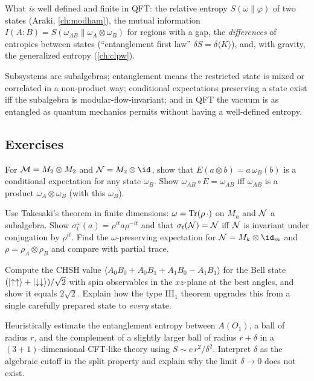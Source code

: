What \emph{is} well defined and finite in QFT: the relative entropy $S(\omega\|\varphi)$ of two states (Araki, \cref{ch:modham}), the mutual information $I(A:B)=S(\omega_{AB}\|\omega_A\otimes\omega_B)$ for regions with a gap, the \emph{differences} of entropies between states (``entanglement first law'' $\delta S=\delta\langle K\rangle$), and, with gravity, the generalized entropy (\cref{ch:clpw}).

\begin{keyidea}
Subsystems are subalgebras; entanglement means the restricted state is mixed or correlated in a non-product way; conditional expectations preserving a state exist iff the subalgebra is modular-flow-invariant; and in QFT the vacuum is as entangled as quantum mechanics permits without having a well-defined entropy.
\end{keyidea}

\subsection*{Exercises}
\begin{exercise}\label{ex:subsystems:1}
For $\mathcal{M}=M_2\otimes M_2$ and $\N=M_2\otimes\id$, show that $E(a\otimes b)=a\,\omega_B(b)$ is a conditional expectation for any state $\omega_B$. Show $\omega_{AB}\circ E=\omega_{AB}$ iff $\omega_{AB}$ is a product $\omega_A\otimes\omega_B$ (with this $\omega_B$).
\end{exercise}
\begin{exercise}\label{ex:subsystems:2}
Use Takesaki's theorem in finite dimensions: $\omega=\operatorname{Tr}(\rho\,\cdot)$ on $M_n$ and $\mathcal{N}$ a subalgebra. Show $\sigma^\omega_t(a)=\rho^{it}a\rho^{-it}$ and that $\sigma_t(\mathcal{N})=\mathcal{N}$ iff $\mathcal{N}$ is invariant under conjugation by $\rho^{it}$. Find the $\omega$-preserving expectation for $\N=M_k\otimes\id_m$ and $\rho=\rho_A\otimes\rho_B$ and compare with partial trace.
\end{exercise}
\begin{exercise}\label{ex:subsystems:3}
Compute the CHSH value $\langle A_0B_0+A_0B_1+A_1B_0-A_1B_1\rangle$ for the Bell state $(\lvert \uparrow\uparrow\rangle+\lvert \downarrow\downarrow\rangle)/\sqrt2$ with spin observables in the $xz$-plane at the best angles, and show it equals $2\sqrt2$. Explain how the type III$_1$ theorem upgrades this from a single carefully prepared state to \emph{every} state.
\end{exercise}
\begin{exercise}\label{ex:subsystems:4}
Heuristically estimate the entanglement entropy between $A(O_1)$, a ball of radius $r$, and the complement of a slightly larger ball of radius $r+\delta$ in a $(3+1)$-dimensional CFT-like theory using $S\sim c\,r^2/\delta^2$. Interpret $\delta$ as the algebraic cutoff in the split property and explain why the limit $\delta\to0$ does not exist.
\end{exercise}


